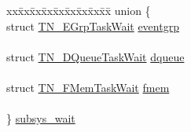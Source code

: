 \begin{DoxyCompactItemize}
\begin{tabbing}
xx\=xx\=xx\=xx\=xx\=xx\=xx\=xx\=xx\=\kill
union \{\\
\>struct \hyperlink{structTN__EGrpTaskWait}{TN\_EGrpTaskWait} \hyperlink{structTN__Task_a22c8cfe2e95d6f891aa568cafdb95936}{eventgrp}\\
\>\\
\>struct \hyperlink{structTN__DQueueTaskWait}{TN\_DQueueTaskWait} \hyperlink{structTN__Task_aa536e1eba96904c006d1e61efc520378}{dqueue}\\
\>\\
\>struct \hyperlink{structTN__FMemTaskWait}{TN\_FMemTaskWait} \hyperlink{structTN__Task_a31921e5384127319bffd5ae09debac1e}{fmem}\\
\>\\
\} \hyperlink{structTN__Task_ae6f4bd3d67e5499ef2c5fb7c72ec6276}{subsys\_wait}\\


\end{tabbing}
\end{DoxyCompactItemize}
